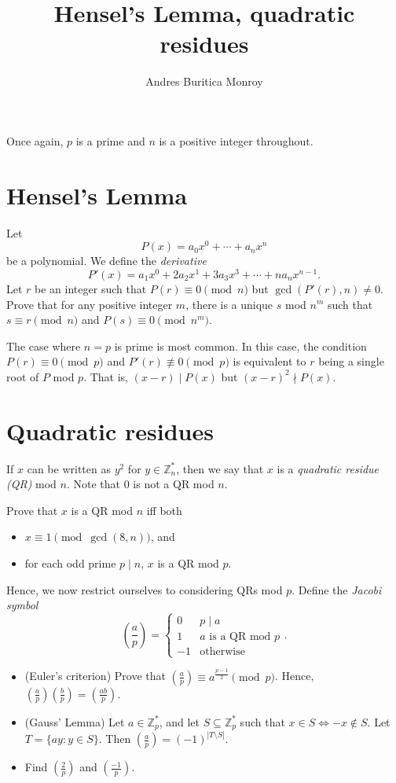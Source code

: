 \documentclass{article}
\title{Hensel's Lemma, quadratic residues}
\author{Andres Buritica Monroy}
\date{}
\newcommand\Zz{\mathbb{Z}}
\begin{document}
\maketitle
Once again, $p$ is a prime and $n$ is a positive integer throughout.
\section{Hensel's Lemma}
Let
\[P(x)=a_0x^0+\cdots+a_n x^n\] be a polynomial. We define the \emph{derivative}
\[P'(x)=a_1 x^0+2a_2 x^1+3a_3 x^3+\cdots+na_n x^{n-1}.\]
Let $r$ be an integer such that $P(r)\equiv 0\pmod n$ but $\gcd(P'(r),n)\ne 0$.
Prove that for any positive integer $m$, there is a unique $s$ mod $n^m$ such
that $s\equiv r\pmod n$ and $P(s)\equiv 0\pmod {n^m}$.

The case where $n=p$ is prime is most common. In this case, the condition
$P(r)\equiv 0\pmod p$ and $P'(r)\not\equiv 0\pmod p$ is equivalent to $r$ being
a single root of $P$ mod $p$. That is, $(x-r)\mid P(x)$ but $(x-r)^2\nmid
P(x)$.
\section{Quadratic residues}
If $x$ can be written as $y^2$ for $y\in\Zz_n^*$, then we say that $x$ is a
\emph{quadratic residue (QR)} mod $n$. Note that $0$ is not a QR mod $n$.

Prove that $x$ is a QR mod $n$ iff both
\begin{itemize}
  \item $x\equiv 1\pmod{\gcd(8,n)}$, and
  \item for each odd prime $p\mid n$, $x$ is a QR mod $p$.
\end{itemize}

Hence, we now restrict ourselves to considering QRs mod $p$.
Define the \emph{Jacobi symbol}
\[\left(\frac ap\right)=\begin{cases} 0&p\mid a \\ 1&a\text{ is a QR mod }p \\
-1&\text{otherwise}\end{cases}.\]

\begin{itemize}
  \item (Euler's criterion) Prove that
    $\left(\frac ap\right)\equiv a^{\frac{p-1}2}\pmod p$.
    Hence, $\left(\frac ap\right)\left(\frac
    bp\right)=\left(\frac{ab}p\right)$.
  \item (Gauss' Lemma) Let $a\in\Zz_p^*$, and let $S\subseteq\Zz_p^*$ such that $x\in S\iff
    -x\not\in S$. Let $T=\{ay:y\in S\}$. Then
    $\left(\frac ap\right)=(-1)^{|T\setminus S|}$.
  \item Find $\left(\frac 2p\right)$ and $\left(\frac{-1}p\right)$.
\end{itemize}
\end{document}
